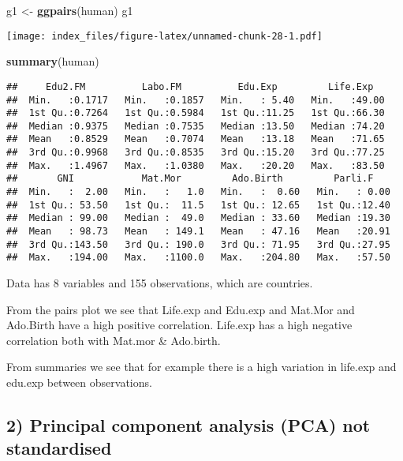 \documentclass[]{article}
\newenvironment{Shaded}{\begin{snugshade}}{\end{snugshade}}
\newcommand{\KeywordTok}[1]{\textcolor[rgb]{0.13,0.29,0.53}{\textbf{#1}}}
\newcommand{\StringTok}[1]{\textcolor[rgb]{0.31,0.60,0.02}{#1}}
\newcommand{\NormalTok}[1]{#1}
\begin{document}
\begin{Shaded}
\begin{Highlighting}[]
\NormalTok{g1 <-}\StringTok{ }\KeywordTok{ggpairs}\NormalTok{(human)}
\NormalTok{g1}
\end{Highlighting}
\end{Shaded}

\texttt{[image: index\_files/figure-latex/unnamed-chunk-28-1.pdf]}

\begin{Shaded}
\begin{Highlighting}[]
\KeywordTok{summary}\NormalTok{(human)}
\end{Highlighting}
\end{Shaded}

\begin{verbatim}
##     Edu2.FM          Labo.FM          Edu.Exp         Life.Exp    
##  Min.   :0.1717   Min.   :0.1857   Min.   : 5.40   Min.   :49.00  
##  1st Qu.:0.7264   1st Qu.:0.5984   1st Qu.:11.25   1st Qu.:66.30  
##  Median :0.9375   Median :0.7535   Median :13.50   Median :74.20  
##  Mean   :0.8529   Mean   :0.7074   Mean   :13.18   Mean   :71.65  
##  3rd Qu.:0.9968   3rd Qu.:0.8535   3rd Qu.:15.20   3rd Qu.:77.25  
##  Max.   :1.4967   Max.   :1.0380   Max.   :20.20   Max.   :83.50  
##       GNI            Mat.Mor         Ado.Birth         Parli.F     
##  Min.   :  2.00   Min.   :   1.0   Min.   :  0.60   Min.   : 0.00  
##  1st Qu.: 53.50   1st Qu.:  11.5   1st Qu.: 12.65   1st Qu.:12.40  
##  Median : 99.00   Median :  49.0   Median : 33.60   Median :19.30  
##  Mean   : 98.73   Mean   : 149.1   Mean   : 47.16   Mean   :20.91  
##  3rd Qu.:143.50   3rd Qu.: 190.0   3rd Qu.: 71.95   3rd Qu.:27.95  
##  Max.   :194.00   Max.   :1100.0   Max.   :204.80   Max.   :57.50
\end{verbatim}

Data has 8 variables and 155 observations, which are countries.

From the pairs plot we see that Life.exp and Edu.exp and Mat.Mor and
Ado.Birth have a high positive correlation. Life.exp has a high negative
correlation both with Mat.mor \& Ado.birth.

From summaries we see that for example there is a high variation in
life.exp and edu.exp between observations.

\subsection{2) Principal component analysis (PCA) not
standardised}\label{principal-component-analysis-pca-not-standardised}
\end{document}
